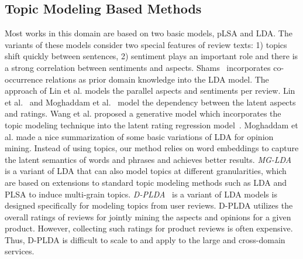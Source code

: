\subsection{Topic Modeling Based Methods}
Most works in this domain are based on two basic models, 
pLSA\cite{hofmann1999probabilistic} and LDA\cite{Blei2003LatentDA}. 
The variants of these models consider two special features of review texts:
1) topics shift quickly between sentences,
2) sentiment plays an important role and there is a strong 
correlation between sentiments and aspects. 
Shams~\cite{shams2017enriched} incorporates co-occurrence relations as prior domain knowledge into the LDA model.
The approach of Lin et al. \cite{lakkaraju2011exploiting} models 
the parallel aspects and sentiments per review. 
Lin et al.~\cite{lin2009joint} and Moghaddam et al.~\cite{moghaddam2011ilda} model the dependency between 
the latent aspects and ratings. 
Wang et al. \cite{wang2011latent} proposed 
a generative model which incorporates the topic modeling technique 
into the latent rating regression model~\cite{wang2010latent}.
Moghaddam et al. \cite{moghaddam2012design} made a nice 
summarization of some basic variations of LDA for opinion mining.
Instead of using topics, our method relies on word embeddings to capture
the latent semantics of words and phrases and achieves better results.
\emph{MG-LDA}~\cite{titov2008modeling} is a variant of LDA that can also model topics at different granularities, which are based on extensions to standard topic modeling methods such as LDA and PLSA to induce multi-grain topics. 
\emph{D-PLDA}~\cite{moghaddam2012design}
is a variant of LDA models is designed specifically for modeling topics from user reviews.  
D-PLDA utilizes the overall ratings of reviews for jointly 
mining the aspects and opinions for a given product.
However,  collecting such ratings for product reviews is often expensive.  
Thus, D-PLDA is difficult to scale to and apply to the large
and cross-domain services.


